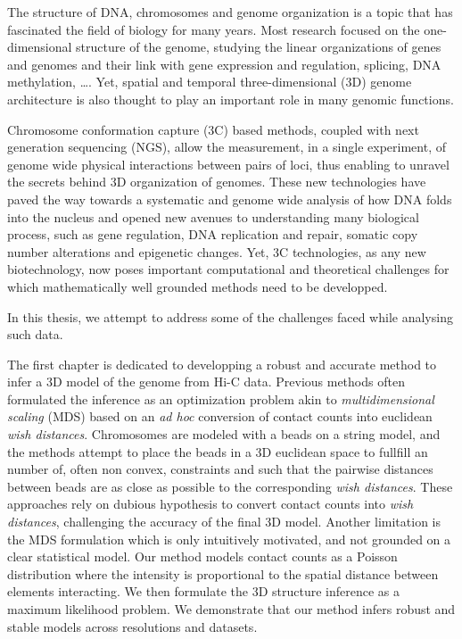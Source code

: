 


\begin{abstracts}        %

The structure of DNA, chromosomes and genome organization is a topic that has
fascinated the field of biology for many years. Most research focused on the
one-dimensional structure of the genome, studying the linear organizations of
genes and genomes and their link with gene expression and regulation,
splicing, DNA methylation, \dots. Yet, spatial and temporal three-dimensional
(3D) genome architecture is also thought to play an important role in many
genomic functions.

Chromosome conformation capture (3C) based methods, coupled with next
generation sequencing (NGS), allow the measurement, in a single experiment, of
genome wide physical interactions between pairs of loci, thus enabling to
unravel the secrets behind 3D organization of genomes. These new technologies
have paved the way towards a systematic and genome wide analysis of how DNA
folds into the nucleus and opened new avenues to understanding many biological
process, such as gene regulation, DNA replication and repair, somatic copy
number alterations and epigenetic changes. Yet, 3C technologies, as any new
biotechnology, now poses important computational and theoretical challenges
for which mathematically well grounded methods need to be developped.

In this thesis, we attempt to address some of the challenges faced while
analysing such data.

The first chapter is dedicated to developping a robust and accurate method to
infer a 3D model of the genome from Hi-C data. Previous methods often
formulated the inference as an optimization problem akin to {\em
multidimensional scaling } (MDS) based on an {\em ad hoc} conversion of
contact counts into euclidean {\em wish distances}. Chromosomes are modeled
with a beads on a string model, and the methods attempt to place the beads in
a 3D euclidean space to fullfill an number of, often non convex, constraints
and such that the pairwise distances between beads are as close as possible
to the corresponding {\em wish distances}. These approaches rely on dubious
hypothesis to convert contact counts into {\em wish distances}, challenging
the accuracy of the final 3D model. Another limitation is the MDS formulation
which is only intuitively motivated, and not grounded on a clear statistical
model. Our method models contact counts as a Poisson distribution where the
intensity is proportional to the spatial distance between elements
interacting. We then formulate the 3D structure inference as a maximum
likelihood problem. We demonstrate that our method infers robust and stable
models across resolutions and datasets.


\end{abstracts}
